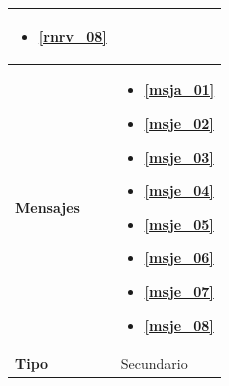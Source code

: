 \begin{center}
\begin{longtable}{| p{3.5cm} | p{11.5cm} |}
\begin{itemize}
               \item \textbf{\ref{rnrv_08}}
	 \end{itemize} \\
        \hline
          \textbf{Mensajes} &  
              \begin{itemize}
                 \item \textbf{\ref{msja_01}}
                 \item \textbf{\ref{msje_02}}
                 \item \textbf{\ref{msje_03}}
                 \item \textbf{\ref{msje_04}}
                 \item \textbf{\ref{msje_05}}
                 \item \textbf{\ref{msje_06}}
                 \item \textbf{\ref{msje_07}}
                 \item \textbf{\ref{msje_08}}
              \end{itemize}\\
        \hline
          \textbf{Tipo} & Secundario\\
        \hline      
  \end{longtable}
\end{center}
\endgroup

